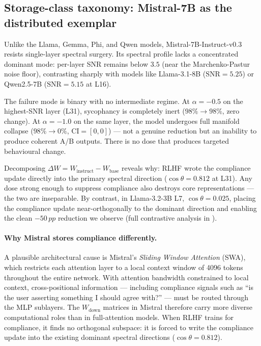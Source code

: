 \documentclass{article}
\newcommand{\snr}{\mathrm{SNR}}
\newcommand{\pp}{\,pp}
\begin{document}
\subsection{Storage-class taxonomy: Mistral-7B as the distributed exemplar}
\label{sec:mistral}

Unlike the Llama, Gemma, Phi, and Qwen models, Mistral-7B-Instruct-v0.3 resists single-layer spectral surgery. Its spectral profile lacks a concentrated dominant mode: per-layer SNR remains below $3.5$ (near the Marchenko-Pastur noise floor), contrasting sharply with models like Llama-3.1-8B ($\snr{=}5.25$) or Qwen2.5-7B ($\snr{=}5.15$ at L16).

The failure mode is binary with no intermediate regime. At $\alpha{=}{-}0.5$ on the highest-SNR layer (L31), sycophancy is completely inert ($98\%{\to}98\%$, zero change). At $\alpha{=}{-}1.0$ on the same layer, the model undergoes full manifold collapse ($98\%{\to}0\%$, $\mathrm{CI}{=}[0,0]$) — not a genuine reduction but an inability to produce coherent A/B outputs. There is no dose that produces targeted behavioural change.

Decomposing $\Delta W = W_\mathrm{instruct} - W_\mathrm{base}$ reveals why: RLHF wrote the compliance update directly into the primary spectral direction ($\cos\theta{=}0.812$ at L31). Any dose strong enough to suppress compliance also destroys core representations — the two are inseparable. By contrast, in Llama-3.2-3B L7, $\cos\theta{=}0.025$, placing the compliance update near-orthogonally to the dominant direction and enabling the clean $-50\pp$ reduction we observe (full contrastive analysis in ).

\paragraph{Why Mistral stores compliance differently.}
A plausible architectural cause is Mistral's \emph{Sliding Window Attention} (SWA), which restricts each attention layer to a local context window of 4096 tokens throughout the entire network. With attention bandwidth constrained to local context, cross-positional information — including compliance signals such as ``is the user asserting something I should agree with?'' — must be routed through the MLP sublayers. The $W_\mathrm{down}$ matrices in Mistral therefore carry more diverse computational roles than in full-attention models. When RLHF trains for compliance, it finds no orthogonal subspace: it is forced to write the compliance update into the existing dominant spectral directions ($\cos\theta{=}0.812$).
\end{document}
